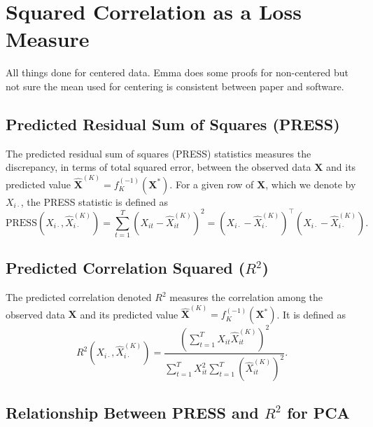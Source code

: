 \section{Squared Correlation as a Loss Measure}

All things done for centered data. Emma does some proofs for non-centered but not sure the mean used for centering is consistent between paper and software.

\subsection{Predicted Residual Sum of Squares (PRESS)}

The predicted residual sum of squares (PRESS) statistics measures the discrepancy, in terms of total squared error, between the observed data $\mathbf{X}$ and its predicted value $\widehat{\mathbf{X}}^{(K)} = f^{(-1)}_K(\mathbf{X}^*)$. For a given row of $\mathbf{X}$, which we denote by $X_{i\cdot}$, the PRESS statistic is defined as
$$
\text{PRESS}\left(X_{i\cdot}, \widehat{X}^{(K)}_{i\cdot}\right) = \sum_{t = 1}^T \left(X_{it} - \widehat{X}^{(K)}_{it}\right)^2 = \left(X_{i\cdot} - \widehat{X}^{(K)}_{i\cdot}\right)^\top \left(X_{i\cdot} - \widehat{X}^{(K)}_{i\cdot}\right).
$$

\subsection{Predicted Correlation Squared ($R^2$)}

The predicted correlation denoted $R^2$ measures the correlation among the observed data $\mathbf{X}$ and its predicted value $\widehat{\mathbf{X}}^{(K)} = f^{(-1)}_K(\mathbf{X}^*)$. It is defined as
$$
R^2 \left(X_{i\cdot}, \widehat{X}^{(K)}_{i\cdot}\right) =
\frac{\left(\sum_{t = 1}^T X_{it}\widehat{X}^{(K)}_{it}\right)^2}{\sum_{t = 1}^T X_{it}^2\sum_{t = 1}^T\left(\widehat{X}^{(K)}_{it}\right)^2}.
$$

\subsection{Relationship Between PRESS and $R^2$ for PCA}

